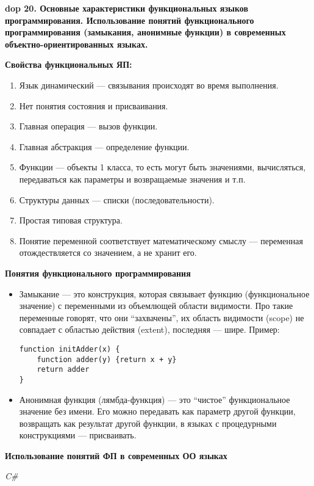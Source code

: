 \textbf{\LARGE dop 20. Основные  характеристики  функциональных  языков  программирования.  Использование  понятий функционального  программирования  (замыкания,  анонимные функции)  в  современных  объектно-ориентированных языках.}

\textbf{Свойства функциональных ЯП:}
\begin{enumerate}
    \item Язык динамический --- связывания происходят во время выполнения.
    \item Нет понятия состояния и присваивания.
    \item Главная операция --- вызов функции.
    \item Главная абстракция --- определение функции.
    \item Функции --- объекты 1 класса, то есть могут быть значениями, вычисляться, передаваться как параметры и возвращаемые значения и т.п.
    \item Структуры данных --- списки (последовательности).
    \item Простая типовая структура.
    \item Понятие переменной соответствует математическому смыслу --- переменная отождествляется со значением, а не хранит его.
\end{enumerate}

\textbf{Понятия функционального программирования}

\begin{itemize}
    \item Замыкание --- это конструкция, которая связывает функцию (функциональное значение) с переменными из объемлющей области видимости.
    Про такие переменные говорят, что они ``захвачены'', их область видимости (scope) не совпадает с областью действия (extent), последняя --- шире.
    Пример:
    \begin{lstlisting}
function initAdder(x) {
    function adder(y) {return x + y}
    return adder
}
    \end{lstlisting}
    \item Анонимная функция (лямбда-функция) --- это ``чистое'' функциональное значение без имени. 
    Его можно передавать как параметр другой функции, возвращать как результат другой функции, в языках с процедурными конструкциями --- присваивать.
\end{itemize}

\textbf{Использование понятий ФП в современных ОО языках}

\textit{C\#}

